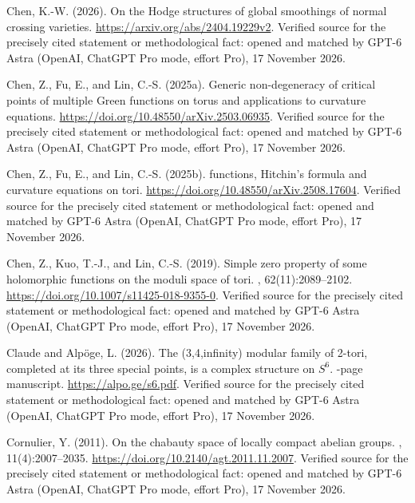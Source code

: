 \begin{thebibliography}{}
Chen, K.-W. (2026).
\newblock On the {Hodge} structures of global smoothings of normal crossing
  varieties.
\newblock \url{https://arxiv.org/abs/2404.19229v2}. Verified source for the precisely cited statement or methodological fact: opened and matched by GPT-6 Astra (OpenAI, ChatGPT Pro mode, effort Pro), 17 November 2026.

Chen, Z., Fu, E., and Lin, C.-S. (2025a).
\newblock Generic non-degeneracy of critical points of multiple {Green}
  functions on torus and applications to curvature equations.
\newblock \url{https://doi.org/10.48550/arXiv.2503.06935}. Verified source for the precisely cited statement or methodological fact: opened and matched by GPT-6 Astra (OpenAI, ChatGPT Pro mode, effort Pro), 17 November 2026.

Chen, Z., Fu, E., and Lin, C.-S. (2025b).
 functions, {Hitchin}'s formula and curvature equations on
  tori.
\newblock \url{https://doi.org/10.48550/arXiv.2508.17604}. Verified source for the precisely cited statement or methodological fact: opened and matched by GPT-6 Astra (OpenAI, ChatGPT Pro mode, effort Pro), 17 November 2026.

Chen, Z., Kuo, T.-J., and Lin, C.-S. (2019).
\newblock Simple zero property of some holomorphic functions on the moduli
  space of tori.
, 62(11):2089--2102.
\newblock \url{https://doi.org/10.1007/s11425-018-9355-0}. Verified source for the precisely cited statement or methodological fact: opened and matched by GPT-6 Astra (OpenAI, ChatGPT Pro mode, effort Pro), 17 November 2026.

{Claude} and Alp{\"o}ge, L. (2026).
\newblock The (3,4,infinity) modular family of 2-tori, completed at its three
  special points, is a complex structure on {$S^6$}.
-page manuscript.
\newblock \url{https://alpo.ge/s6.pdf}. Verified source for the precisely cited statement or methodological fact: opened and matched by GPT-6 Astra (OpenAI, ChatGPT Pro mode, effort Pro), 17 November 2026.

Cornulier, Y. (2011).
\newblock On the chabauty space of locally compact abelian groups.
, 11(4):2007--2035.
\newblock \url{https://doi.org/10.2140/agt.2011.11.2007}. Verified source for the precisely cited statement or methodological fact: opened and matched by GPT-6 Astra (OpenAI, ChatGPT Pro mode, effort Pro), 17 November 2026.


\end{thebibliography}
